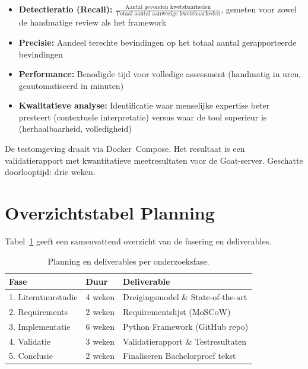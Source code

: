 \begin{itemize}
    \item \textbf{Detectieratio (Recall):} $\frac{\text{Aantal gevonden kwetsbaarheden}}{\text{Totaal aantal aanwezige kwetsbaarheden}}$, gemeten voor zowel de handmatige review als het framework
    \item \textbf{Precisie:} Aandeel terechte bevindingen op het totaal aantal gerapporteerde bevindingen
    \item \textbf{Performance:} Benodigde tijd voor volledige assessment (handmatig in uren, geautomatiseerd in minuten)
    \item \textbf{Kwalitatieve analyse:} Identificatie waar menselijke expertise beter presteert (contextuele interpretatie) versus waar de tool superieur is (herhaalbaarheid, volledigheid)
\end{itemize}

De testomgeving draait via Docker~Compose. Het resultaat is een validatierapport met kwantitatieve meetresultaten voor de Goat-server. Geschatte doorlooptijd: drie weken.

\section{Overzichtstabel Planning}

Tabel~\ref{tab:planning} geeft een samenvattend overzicht van de fasering en deliverables.

\begin{table}[htbp]
    \centering
    \caption{Planning en deliverables per onderzoeksfase.}
    \label{tab:planning}
    \begin{tabular}{@{}llp{6cm}@{}}
        \toprule
        \textbf{Fase}       & \textbf{Duur} & \textbf{Deliverable}               \\ \midrule
        1. Literatuurstudie & 4 weken       & Dreigingsmodel \& State-of-the-art \\
        2. Requirements     & 2 weken       & Requirementslijst (MoSCoW)         \\
        3. Implementatie    & 6 weken       & Python Framework (GitHub repo)     \\
        4. Validatie        & 3 weken       & Validatierapport \& Testresultaten \\
        5. Conclusie        & 2 weken       & Finaliseren Bachelorproef tekst    \\ \bottomrule
    \end{tabular}
\end{table}

